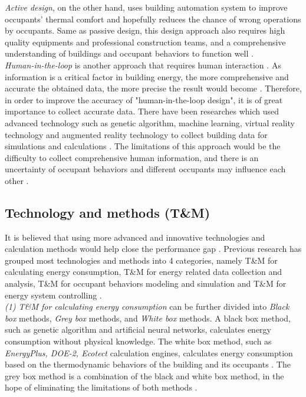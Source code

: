 \documentclass[a4paper, oneside]{discothesis}
\begin{document}
			\textit{Active design}, on the other hand, uses building automation system to improve occupants' thermal comfort and hopefully reduces the chance of wrong operations by occupants. Same as passive design, this design approach also requires high quality equipments and professional construction teams, and a comprehensive understanding of buildings and occupant behaviors to function well \cite{DEWILDE201440}.\\

			\textit{Human-in-the-loop} is another approach that requires human interaction \cite{karwowski2001international}. As information is a critical factor in building energy, the more comprehensive and accurate the obtained data, the more precise the result would become \cite{NIU2016275}. Therefore, in order to improve the accuracy of "human-in-the-loop design", it is of great importance to collect accurate data. There have been researches which used advanced technology such as genetic algorithm, machine learning, virtual reality technology and augmented reality technology to collect building data for simulations and calculations \cite{karwowski2001international}. The limitations of this approach would be the difficulty to collect comprehensive human information, and there is an uncertainty of occupant behaviors and different occupants may influence each other \cite{masoso2010dark}.

		\subsection{Technology and methods (T\&M)}

			It is believed that using more advanced and innovative technologies and calculation methods would help close the performance gap \cite{ZOU2018165}. Previous research has grouped most technologies and methods into 4 categories, namely T\&M for calculating energy consumption, T\&M for energy related data collection and analysis, T\&M for occupant behaviors modeling and simulation and T\&M for energy system controlling \cite{ZOU2018165}.\\

			\textit{(1) T\&M for calculating energy consumption} can be further divided into \textit{Black box} methods, \textit{Grey box} methods, and \textit{White box} methods. A black box method, such as genetic algorithm and artificial neural networks, calculates energy consumption without physical knowledge. The white box method, such as \textit{EnergyPlus, DOE-2, Ecotect} calculation engines, calculates energy consumption based on the thermodynamic behaviors of the building and its occupants \cite{li2014methods,xu2007optimal}. The grey box method is a combination of the black and white box method, in the hope of eliminating the limitations of both methods \cite{ZOU2018165}.\\
\end{document}
